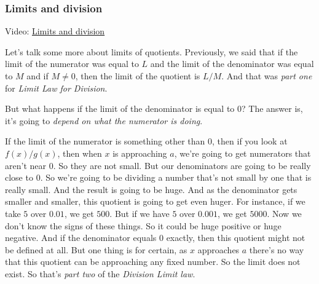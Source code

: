 \documentclass[pdftex, brazil, 12pt, twoside]{article}
\begin{document}
\subsubsection{Limits and division}
\label{u0-lim-quo-lim-div}

Video: \href{https://www.youtube.com/watch?v=HBWjEmPpItk}{Limits and division}

Let's talk some more about limits of quotients.
Previously, we said that if the limit of the numerator
was equal to $L$ and the limit of the denominator was equal to $M$
and if $M \ne 0$, then the limit of the quotient
is $L/M$. And that was \emph{part one} for \emph{Limit Law for Division}.

\begin{figure}[H]
  \begin{center}
  \end{center}
\end{figure}

But what happens if the limit of the denominator is equal to $0$?
The answer is, it's going to \emph{depend
on what the numerator is doing}.

If the limit of the numerator is something other than $0$,
then if you look at $f(x)/g(x)$, then when $x$
is approaching $a$, we're going to get
numerators that aren't near $0$.
So they are not small.
But our denominators are going to be really close to $0$.
So we're going to be dividing a number that's not small by one
that is really small.
And the result is going to be huge.
And as the denominator gets smaller and smaller,
this quotient is going to get even huger.
For instance, if we take $5$ over $0.01$, we get $500$.
But if we have $5$ over $0.001$, we get $5000$.
Now we don't know the signs of these things.
So it could be huge positive or huge negative.
And if the denominator equals $0$ exactly,
then this quotient might not be defined at all.
But one thing is for certain, as $x$ approaches
$a$ there's no way that this quotient can be approaching
any fixed number.
So the limit does not exist.
So that's \emph{part two} of the \emph{Division Limit law}.
\end{document}

